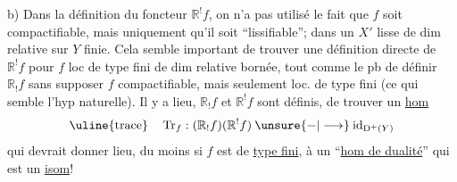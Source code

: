 b) Dans la définition du foncteur $\mathbb{R}^!f$, on n'a pas utilisé le fait que $f$ soit compactifiable, mais uniquement qu'il soit ``lissifiable'';  dans un $X'$ lisse de dim relative sur $Y$ finie.
Cela semble   important de trouver une définition directe de $\mathbb{R}^!f$ pour $f$ loc de type fini de dim relative bornée, tout comme le pb de définir $\mathbb{R}_!f$ sans supposer $f$ compactifiable, mais seulement loc. de type fini (ce qui semble l'hyp naturelle).
Il y a lieu,  $\mathbb{R}_!f$ et $\mathbb{R}^!f$ sont définis, de trouver un \uline{hom}
\[
\uline{\text{trace}}\quad
\operatorname{Tr}_f:(\mathbb{R}_!f)(\mathbb{R}^!f)\mathbin{\unsure{-|\longrightarrow}}
\operatorname{id}_{\mathrm D^+(Y)}
\]
qui devrait donner lieu, du moins si $f$ est de \uline{type fini}, à un ``\uline{hom de dualité}'' qui est un \uline{isom}!
